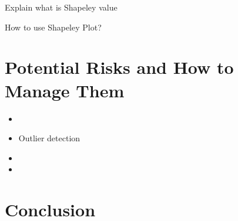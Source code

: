\documentclass{article}
\begin{document}
Explain what is Shapeley value 

How to use Shapeley Plot?



\section{Potential Risks and How to Manage Them}

\begin{itemize}
    \item 
    \item Outlier detection
    \item 
    \item 
\end{itemize}


\section{Conclusion}





\end{document}
